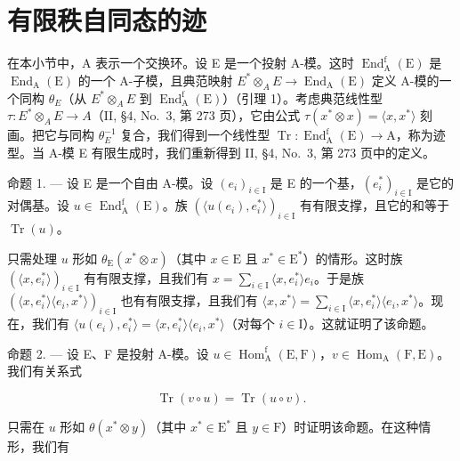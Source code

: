 \section{有限秩自同态的迹}

在本小节中，A 表示一个交换环。设 E 是一个投射 A-模。这时 \(\operatorname{End}_{\mathrm{A}}^{\mathrm{f}}(\mathrm{E})\) 是 \(\operatorname{End}_{\mathrm{A}}(\mathrm{E})\) 的一个 A-子模，且典范映射 \(E^{*}\otimes_{A}E\to\operatorname{End}_{\mathrm{A}}(\mathrm{E})\) 定义 A-模的一个同构 \(\theta_{E}\)（从 \(E^{*}\otimes_{A}E\) 到 \(\operatorname{End}_{\mathrm{A}}^{\mathrm{f}}(\mathrm{E})\)）（引理 1）。考虑典范线性型 \(\tau:E^{*}\otimes_{A}E\to A\)（II, §4, No.~3, 第 273 页），它由公式 \(\tau(x^{*}\otimes x)=\langle x,x^{*}\rangle\) 刻画。把它与同构 \(\theta_{E}^{-1}\) 复合，我们得到一个线性型 \(\operatorname{Tr}: \operatorname{End}_{\mathrm{A}}^{\mathrm{f}}(\mathrm{E})\to\mathrm{A}\)，称为迹型。当 A-模 E 有限生成时，我们重新得到 II, §4, No.~3, 第 273 页中的定义。

命题 1. --- 设 E 是一个自由 A-模。设 \((e_{i})_{i\in\mathrm{I}}\) 是 E 的一个基，\((e_{i}^{*})_{i\in\mathrm{I}}\) 是它的对偶基。设 \(u\in\operatorname{End}_{\mathrm{A}}^{\mathrm{f}}(\mathrm{E})\)。族 \((\langle u(e_{i}),e_{i}^{*}\rangle)_{i\in\mathrm{I}}\) 有有限支撑，且它的和等于 \(\operatorname{Tr}(u)\)。

只需处理 \(u\) 形如 \(\theta_{\mathrm{E}}(x^{*} \otimes x)\)（其中 \(x \in \mathrm{E}\) 且 \(x^{*} \in \mathrm{E}^{*}\)）的情形。这时族 \((\langle x, e_{i}^{*} \rangle)_{i \in \mathrm{I}}\) 有有限支撑，且我们有 \(x = \sum_{i \in \mathrm{I}} \langle x, e_{i}^{*} \rangle e_{i}\)。于是族 \((\langle x, e_{i}^{*} \rangle \langle e_{i}, x^{*} \rangle)_{i \in \mathrm{I}}\) 也有有限支撑，且我们有 \(\langle x, x^{*} \rangle = \sum_{i \in \mathrm{I}} \langle x, e_{i}^{*} \rangle \langle e_{i}, x^{*} \rangle\)。现在，我们有 \(\langle u(e_{i}), e_{i}^{*} \rangle = \langle x, e_{i}^{*} \rangle \langle e_{i}, x^{*} \rangle\)（对每个 \(i \in \mathrm{I}\)）。这就证明了该命题。

命题 2. --- 设 E、F 是投射 A-模。设 \(u \in \operatorname{Hom}_{\mathrm{A}}^{\mathrm{f}}(\mathrm{E}, \mathrm{F})\)，\(v \in \operatorname{Hom}_{\mathrm{A}}(\mathrm{F}, \mathrm{E})\)。我们有关系式

\[
\operatorname{Tr} (v \circ u) = \operatorname{Tr} (u \circ v).\tag{3}
\]

只需在 \(u\) 形如 \(\theta(x^{*} \otimes y)\)（其中 \(x^{*} \in \mathrm{E}^{*}\) 且 \(y \in \mathrm{F}\)）时证明该命题。在这种情形，我们有

